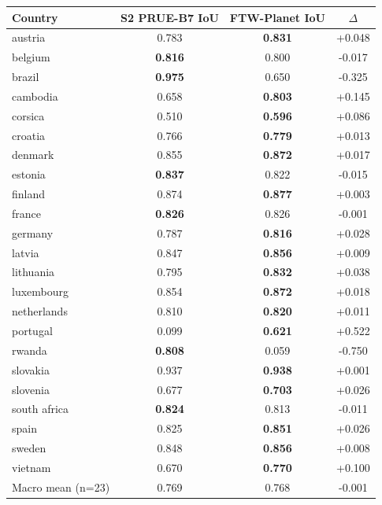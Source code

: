 \begin{tabular}{lccc}
\toprule
Country & S2 PRUE-B7 IoU & FTW-Planet IoU & $\Delta$ \\
\midrule
austria & 0.783 & \textbf{0.831} & +0.048 \\
belgium & \textbf{0.816} & 0.800 & -0.017 \\
brazil & \textbf{0.975} & 0.650 & -0.325 \\
cambodia & 0.658 & \textbf{0.803} & +0.145 \\
corsica & 0.510 & \textbf{0.596} & +0.086 \\
croatia & 0.766 & \textbf{0.779} & +0.013 \\
denmark & 0.855 & \textbf{0.872} & +0.017 \\
estonia & \textbf{0.837} & 0.822 & -0.015 \\
finland & 0.874 & \textbf{0.877} & +0.003 \\
france & \textbf{0.826} & 0.826 & -0.001 \\
germany & 0.787 & \textbf{0.816} & +0.028 \\
latvia & 0.847 & \textbf{0.856} & +0.009 \\
lithuania & 0.795 & \textbf{0.832} & +0.038 \\
luxembourg & 0.854 & \textbf{0.872} & +0.018 \\
netherlands & 0.810 & \textbf{0.820} & +0.011 \\
portugal & 0.099 & \textbf{0.621} & +0.522 \\
rwanda & \textbf{0.808} & 0.059 & -0.750 \\
slovakia & 0.937 & \textbf{0.938} & +0.001 \\
slovenia & 0.677 & \textbf{0.703} & +0.026 \\
south africa & \textbf{0.824} & 0.813 & -0.011 \\
spain & 0.825 & \textbf{0.851} & +0.026 \\
sweden & 0.848 & \textbf{0.856} & +0.008 \\
vietnam & 0.670 & \textbf{0.770} & +0.100 \\
\midrule
Macro mean (n=23) & 0.769 & 0.768 & -0.001 \\
\bottomrule
\end{tabular}
